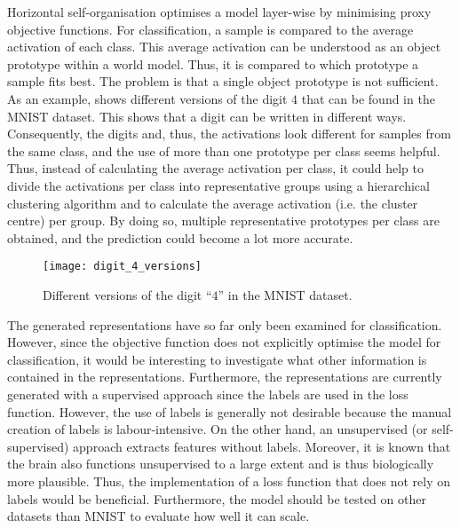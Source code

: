 Horizontal self-organisation optimises a model layer-wise by minimising proxy objective functions.
For classification, a sample is compared to the average activation of each class. This average activation can be understood as an object prototype within a world model. Thus, it is compared to which prototype a sample fits best. The problem is that a single object prototype is not sufficient. As an example,  shows different versions of the digit $4$ that can be found in the MNIST dataset. This shows that a digit can be written in different ways.
Consequently, the digits and, thus, the activations look different for samples from the same class, and the use of more than one prototype per class seems helpful. Thus, instead of calculating the average activation per class, it could help to divide the activations per class into representative groups using a hierarchical clustering algorithm and to calculate the average activation (i.e. the cluster centre) per group. By doing so, multiple representative prototypes per class are obtained, and the prediction could become a lot more accurate.

\begin{figure}[h]
    \centering
    \texttt{[image: digit\_4\_versions]}
    \caption[Different versions of the digit ``$4$'' in the MNIST dataset]{Different versions of the digit ``$4$'' in the MNIST dataset.}
\end{figure}


The generated representations have so far only been examined for classification. However, since the objective function does not explicitly optimise the model for classification, it would be interesting to investigate what other information is contained in the representations. Furthermore, the representations are currently generated with a supervised approach since the labels are used in the loss function. However, the use of labels is generally not desirable because the manual creation of labels is labour-intensive. On the other hand, an unsupervised (or self-supervised) approach extracts features without labels. Moreover, it is known that the brain also functions unsupervised to a large extent and is thus biologically more plausible.
Thus, the implementation of a loss function that does not rely on labels would be beneficial. Furthermore, the model should be tested on other datasets than MNIST to evaluate how well it can scale.

